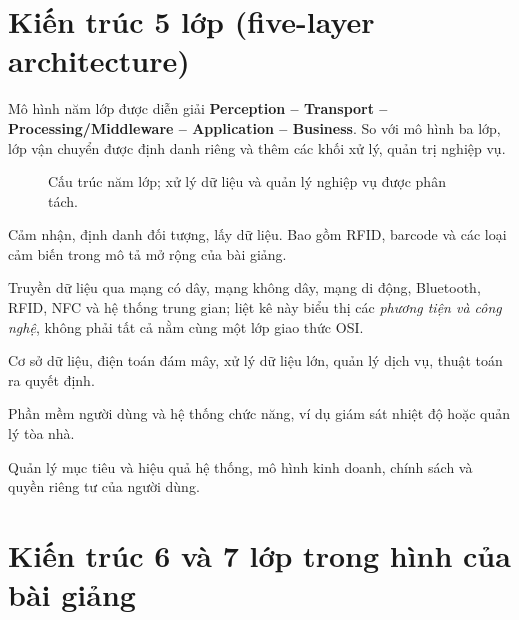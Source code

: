 \section{Kiến trúc 5 lớp (five-layer architecture)}
Mô hình năm lớp được diễn giải \textbf{Perception -- Transport -- Processing/Middleware -- Application -- Business}. So với mô hình ba lớp, lớp vận chuyển được định danh riêng và thêm các khối xử lý, quản trị nghiệp vụ.
\begin{figure}[H]\centering
{}\caption{Cấu trúc năm lớp; xử lý dữ liệu và quản lý nghiệp vụ được phân tách.}
\end{figure}
\begin{description}[leftmargin=0.5cm,style=nextline]
\item[Perception] Cảm nhận, định danh đối tượng, lấy dữ liệu. Bao gồm RFID, barcode và các loại cảm biến trong mô tả mở rộng của bài giảng.
\item[Transport] Truyền dữ liệu qua mạng có dây, mạng không dây, mạng di động, Bluetooth, RFID, NFC và hệ thống trung gian; liệt kê này biểu thị các \textit{phương tiện và công nghệ}, không phải tất cả nằm cùng một lớp giao thức OSI.
\item[Processing/Middleware] Cơ sở dữ liệu, điện toán đám mây, xử lý dữ liệu lớn, quản lý dịch vụ, thuật toán ra quyết định.
\item[Application] Phần mềm người dùng và hệ thống chức năng, ví dụ giám sát nhiệt độ hoặc quản lý tòa nhà.
\item[Business] Quản lý mục tiêu và hiệu quả hệ thống, mô hình kinh doanh, chính sách và quyền riêng tư của người dùng.
\end{description}

\section{Kiến trúc 6 và 7 lớp trong hình của bài giảng}
